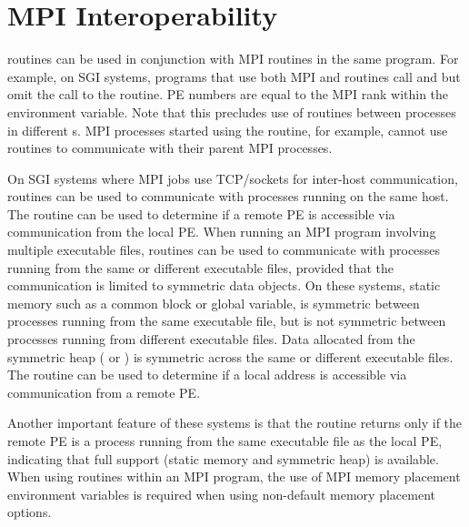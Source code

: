 \section{\ac{MPI} Interoperability}
\begin{sloppypar} %
\openshmem routines can be used in conjunction with \ac{MPI}
routines  in the same program.  For example, on SGI systems, programs that use both \ac{MPI} and \openshmem routines call  and  but omit the call to the  routine.  \openshmem \ac{PE} numbers are equal to the \ac{MPI} rank within the  environment variable.  Note that this precludes use of \openshmem routines between processes in different s. 
\ac{MPI} processes started using the  routine, for
example, cannot use \openshmem routines to communicate with their parent
\ac{MPI} processes.
\end{sloppypar}
On SGI systems where \ac{MPI} jobs use TCP/sockets for inter-host communication, \openshmem routines can be used to communicate with processes running on the same host.  The  routine can be used to determine if a remote \ac{PE} is accessible via \openshmem communication from the local \ac{PE}. When running an \ac{MPI} program involving multiple executable files, \openshmem routines can be used to communicate with processes running from the same or different executable files, provided that the communication is limited to symmetric data objects.  On these systems, static memory such as a \Fortran{} common block or \Clang{} global variable, is symmetric between processes running from the same executable file, but is not symmetric between processes running from different executable files.  Data allocated from the symmetric heap ( or ) is symmetric across the same or different executable files. The routine  can be used to determine if a local address is accessible via \openshmem communication from a remote \ac{PE}.

 Another important feature of these systems is that the  routine returns  only if the remote \ac{PE} is a process running from the same executable file as the local PE, indicating that full \openshmem support (static memory and symmetric heap) is available.  When using \openshmem routines within an \ac{MPI} program, the use of \ac{MPI} memory placement environment variables is required when using non-default memory placement options.
